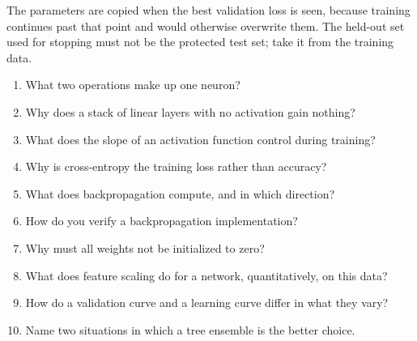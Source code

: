 The parameters are copied when the best validation loss is seen, because training
continues past that point and would otherwise overwrite them. The held-out set
used for stopping must not be the protected test set; take it from the training
data.


\begin{enumerate}
    \item What two operations make up one neuron?
    \item Why does a stack of linear layers with no activation gain nothing?
    \item What does the slope of an activation function control during training?
    \item Why is cross-entropy the training loss rather than accuracy?
    \item What does backpropagation compute, and in which direction?
    \item How do you verify a backpropagation implementation?
    \item Why must all weights not be initialized to zero?
    \item What does feature scaling do for a network, quantitatively, on this data?
    \item How do a validation curve and a learning curve differ in what they vary?
    \item Name two situations in which a tree ensemble is the better choice.
\end{enumerate}


